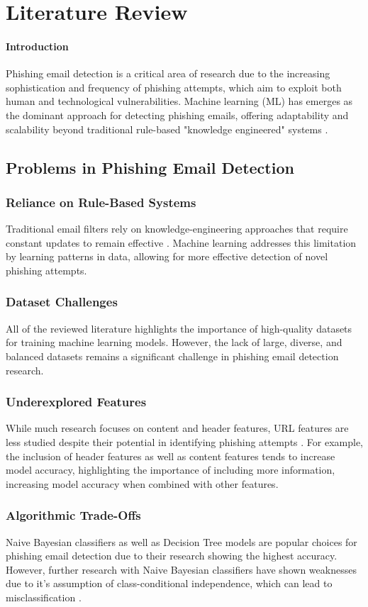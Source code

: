 \section{Literature Review}
\paragraph{Introduction}
Phishing email detection is a critical area of research due to the increasing sophistication and frequency of phishing attempts, which aim to exploit both human and technological vulnerabilities. Machine learning (ML) has emerges as the dominant approach for detecting phishing emails, offering adaptability and scalability beyond traditional rule-based "knowledge engineered" systems \cite{nandhini2020}.

\subsection{Problems in Phishing Email Detection}
\subsubsection{Reliance on Rule-Based Systems}
Traditional email filters rely on knowledge-engineering approaches that require constant updates to remain effective \cite{nandhini2020}. Machine learning addresses this limitation by learning patterns in data, allowing for more effective detection of novel phishing attempts.
\subsubsection{Dataset Challenges}
All of the reviewed literature highlights the importance of high-quality datasets for training machine learning models. However, the lack of large, diverse, and balanced datasets remains a significant challenge in phishing email detection research.
\subsubsection{Underexplored Features}
While much research focuses on content and header features, URL features are less studied despite their potential in identifying phishing attempts \cite{atlam2023}. For example, the inclusion of header features as well as content features tends to increase model accuracy, highlighting the importance of including more information, increasing model accuracy when combined with other features.
\subsubsection{Algorithmic Trade-Offs}
Naive Bayesian classifiers as well as Decision Tree models are popular choices for phishing email detection due to their research showing the highest accuracy. However, further research with Naive Bayesian classifiers have shown weaknesses due to it's assumption of class-conditional independence, which can lead to misclassification \cite{ahmed2022}.

